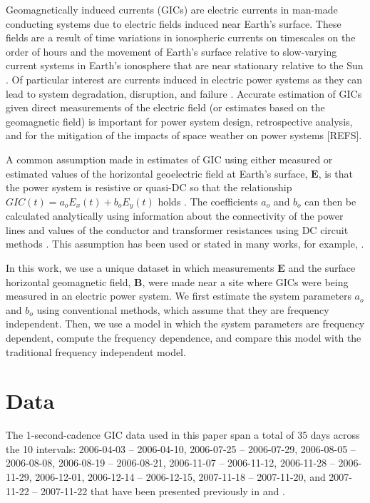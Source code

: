 \documentclass[draft,linenumbers]{agujournal2018}
\begin{document}
Geomagnetically induced currents (GICs) are electric currents in man-made conducting systems due to electric fields induced near Earth's surface. These fields are a result of time variations in ionospheric currents on timescales on the order of hours \citep{Ohtani2000} and the movement of Earth's surface relative to slow-varying current systems in Earth's ionosphere that are near stationary relative to the Sun \citep{Stening2013}. Of particular interest are currents induced in electric power systems as they can lead to system degradation, disruption, and failure \citep{Albertson1993,NERC2012}. Accurate estimation of GICs given direct measurements of the electric field (or estimates based on the geomagnetic field) is important for power system design, retrospective analysis, and for the mitigation of the impacts of space weather on power systems [REFS].

A common assumption made in estimates of GIC using either measured or estimated values of the horizontal geoelectric field at Earth's surface, $\mathbf{E}$, is that the power system is resistive or quasi-DC so that the relationship $GIC(t) = a_oE_x(t) + b_oE_y(t)$ holds \citep{Albertson1981,Lehtinen1985}.  The coefficients $a_o$ and $b_o$ can then be calculated analytically using information about the connectivity of the power lines and values of the conductor and transformer resistances using DC circuit methods \citep[e.g.][]{Boteler2014a,Boteler2014b}. This assumption has been used or stated in many works, for example, \citet{Pulkkinen2007,Wik2008,Pulkkinen2010,Ngwira2011,Viljanen2012,Overbye2012}.

In this work, we use a unique dataset in which measurements $\mathbf{E}$ and the surface horizontal geomagnetic field, $\mathbf{B}$, were made near a site where GICs were being measured in an electric power system.  We first estimate the system parameters $a_o$ and $b_o$ using conventional methods, which assume that they are frequency independent.  Then, we use a model in which the system parameters are frequency dependent, compute the frequency dependence, and compare this model with the traditional frequency independent model. 

\section{Data}

The 1-second-cadence GIC data used in this paper span a total of 35 days across the 10 intervals: 2006-04-03 -- 2006-04-10, 2006-07-25 -- 2006-07-29, 2006-08-05 -- 2006-08-08, 2006-08-19 -- 2006-08-21, 2006-11-07 -- 2006-11-12, 2006-11-28 -- 2006-11-29, 2006-12-01, 2006-12-14 -- 2006-12-15, 2007-11-18 -- 2007-11-20, and 2007-11-22 -- 2007-11-22 that have been presented previously in \citet{Watari2009} and \cite{Watari2015}.
\end{document}
